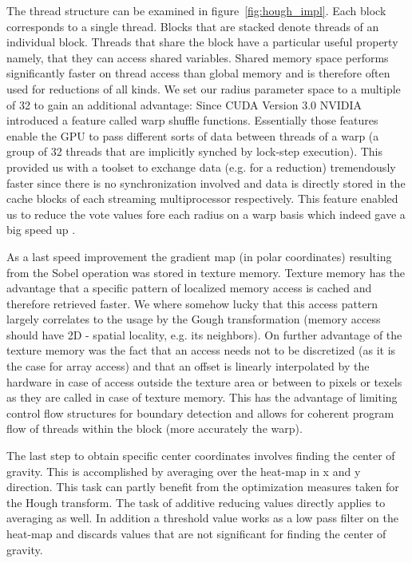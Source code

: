 \documentclass[journal]{IEEEtran}
\begin{document}
\par  The thread structure can be examined in figure~\ref{fig:hough_impl}. Each block corresponds to a single thread. Blocks that are stacked denote threads of an individual block. Threads that share the block have a particular useful property namely, that they can access shared variables. Shared memory space performs significantly faster on thread access than global memory and is therefore often used for reductions of all kinds. We set our radius parameter space to a multiple of 32 to gain an additional advantage: Since CUDA Version 3.0 NVIDIA introduced a feature called warp shuffle functions. Essentially those features enable the GPU to pass different sorts of data between threads of a warp (a group of 32 threads that are implicitly synched by lock-step execution). This provided us with a toolset to exchange data (e.g. for a reduction) tremendously faster since there is no synchronization involved and data is directly stored in the cache blocks of each streaming multiprocessor respectively. This feature enabled us to reduce the vote values fore each radius on a warp basis which indeed gave a big speed up \cite{nvidiaparallel}.
\par As a last speed improvement the gradient map (in polar coordinates) resulting from the Sobel operation was stored in texture memory. Texture memory has the advantage that a specific pattern of localized memory access is cached and therefore retrieved faster. We where somehow lucky that this access pattern largely correlates to the usage by the Gough transformation (memory access should have 2D - spatial locality, e.g. its neighbors). On further advantage of the texture memory was the fact that an access needs not to be discretized (as it is the case for array access) and that an offset is linearly interpolated by the hardware in case of access outside the texture area or between to pixels or texels as they are called in case of texture memory. This has the advantage of limiting control flow structures for boundary detection and allows for coherent program flow of threads within the block (more accurately the warp).
\par The last step to obtain specific center coordinates involves finding the center of gravity. This is accomplished by averaging over the heat-map in x and y direction. This task can partly benefit from the optimization measures taken for the Hough transform. The task of additive reducing values directly applies to averaging as well. In addition a threshold value works as a low pass filter on the heat-map and discards values that are not significant for finding the center of gravity. 
\end{document}
